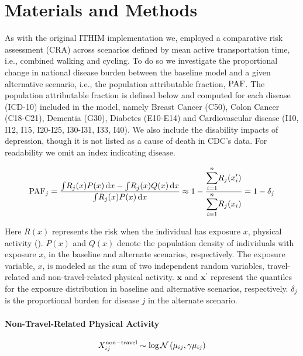 \documentclass[10pt,letterpaper]{article}\usepackage[]{graphicx}\usepackage[]{color}
\begin{document}
\section*{Materials and Methods}


As with the original ITHIM implementation we, employed a comparative
risk assessment (CRA) across scenarios defined by mean active
transportation time, i.e., combined walking and cycling.  To do so we
investigate the proportional change in national disease burden between
the baseline model and a given alternative scenario, i.e., the
population attributable fraction, $\mathrm{PAF}$.  The population attributable
fraction is defined below and computed for each disease (ICD-10)
included in the model, namely Breast Cancer (C50), Colon Cancer
(C18-C21), Dementia (G30), Diabetes (E10-E14) and Cardiovascular
disease (I10, I12, I15, I20-I25, I30-I31, I33, I40).  We also include
the disability impacts of depression, though it is not listed as a
cause of death in CDC's data. For readability we omit an index
indicating disease.

\begin{equation}
\af_j = \frac{\int \! R_j(x)P(x) \, \mathrm{d}x  - \int \! R_j(x)Q(x) \,
  \mathrm{d}x}{\int \! R_j(x)P(x) \, \mathrm{d}x} \approx 1 - \frac{{\displaystyle \sum_{i=1}^n} R_j(x_i^\prime)}{{\displaystyle \sum_{i=1}^n} R_j(x_i)}  = 1 - \delta_j %
  \label{paf}
\end{equation}

Here $R(x)$ represents the risk when the individual has exposure $x$,
physical activity (\mets).  $P(x)$ and $Q(x)$ denote the population
density of individuals with exposure $x$, in the baseline and
alternate scenarios, respectively.  The exposure variable, $x$, is
modeled as the sum of two independent random variables, travel-related
and non-travel-related physical activity.  $\mathbf{x}$ and
$\mathbf{x}^\prime$ represent the quantiles for the exposure
distribution in baseline and alternative scenarios, respectively.
$\delta_j$ is the proportional burden for disease $j$ in the alternate
scenario.

\paragraph{Non-Travel-Related Physical Activity}

\begin{equation}
X_{ij}^{\mathrm{non-travel}} \sim \log\mathcal{N}\left(\mu_{ij}, \gamma \mu_{ij}\right)
\end{equation}
\end{document}
